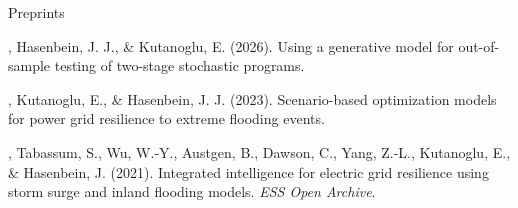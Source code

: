\begin{rSection}{Preprints}
\begin{pubs}
    \item \me, Hasenbein, J. J., \& Kutanoglu, E. (2026). Using a generative model for out-of-sample testing of two-stage stochastic programs. 

    \item \me, Kutanoglu, E., \& Hasenbein, J. J. (2023). Scenario-based optimization models for power grid resilience to extreme flooding events. 

    \item \me, Tabassum, S., Wu, W.-Y., Austgen, B., Dawson, C., Yang, Z.-L., Kutanoglu, E., \& Hasenbein, J. (2021). Integrated intelligence for electric grid resilience using storm surge and inland flooding models. \textit{ESS Open Archive}. 
\end{pubs}
\end{rSection}
